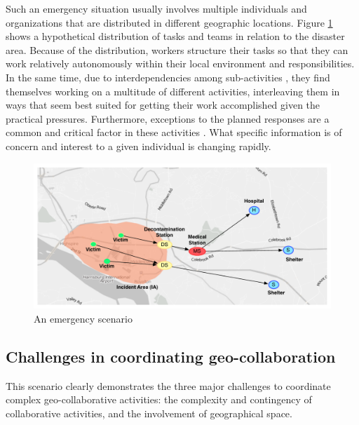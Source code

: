 Such an emergency situation usually involves multiple individuals and organizations that are distributed in different geographic locations. Figure \ref{fig:scenario_overview} shows a hypothetical distribution of tasks and teams in relation to the disaster area. Because of the distribution, workers structure their tasks so that they can work relatively autonomously within their local environment and responsibilities. In the same time, due to interdependencies among sub-activities \cite{shen2004managing}, they find themselves working on a multitude of different activities, interleaving them in ways that seem best suited for getting their work accomplished given the practical pressures. Furthermore, exceptions to the planned responses are a common and critical factor in these activities \cite{Turoff2004}. What specific information is of concern and interest to a given individual is changing rapidly.

\begin{figure}[htbp] %
   \centering
   \includegraphics[width=5.8in]{scenario.pdf} 
   \caption{An emergency scenario}
   \label{fig:scenario_overview}
\end{figure}





\subsection{Challenges in coordinating geo-collaboration} %
\label{sub:challenges_in_coordination}
This scenario clearly demonstrates the three major challenges to coordinate complex geo-collaborative activities: the complexity and contingency of collaborative activities, and the involvement of geographical space.

